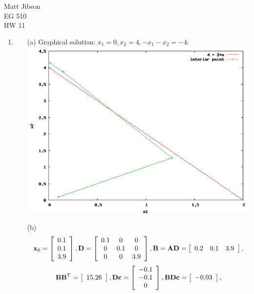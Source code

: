 \documentclass{article}
\begin{document}
\begin{flushright}
Matt Jibson \\
EG 510 \\
HW 11
\end{flushright}

\begin{enumerate}
	\item
		\begin{itemize}
			\item [(a)] Graphical solution: $x_1 = 0, x_2 = 4, -x_1 - x_2 = -4$: \\
				\includegraphics[width=0.8\linewidth]{1a.png}
			\item [(b)]
				\begin{displaymath}
					\mathbf{x}_0 = \left[ \begin{array}{c} 0.1 \\ 0.1 \\ 3.9 \end{array} \right],
					\mathbf{D} = \left[ \begin{array}{c c c} 0.1 & 0 & 0 \\ 0 & 0.1 & 0 \\ 0 & 0 & 3.9 \end{array} \right],
					\mathbf{B} = \mathbf{AD} = \left[ \begin{array}{c c c} 0.2 & 0.1 & 3.9 \end{array} \right],
				\end{displaymath}
				\begin{displaymath}
					\mathbf{BB}^T = \left[ \begin{array}{c} 15.26 \end{array} \right], \mathbf{Dc} = \left[ \begin{array}{c c c} -0.1 \\ -0.1 \\ 0 \end{array} \right], \mathbf{BDc} = \left[ \begin{array}{c} -0.03 \end{array} \right],

\end{displaymath}
\end{itemize}
\end{enumerate}
\end{document}
